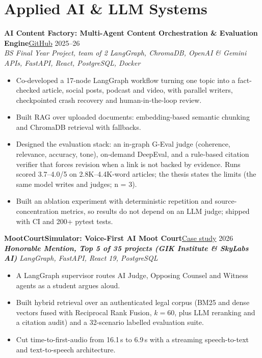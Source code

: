 \documentclass[10pt,a4paper]{article}
\newcommand{\project}[3]{%
  \par\addvspace{5pt}\needspace{6\baselineskip}\textbf{#1}\hfill{\small #2}\\[-1pt]
  {\small\itshape\color{muted} #3}\par}
\begin{document}
\section{Applied AI \& LLM Systems}

\project{AI Content Factory: Multi-Agent Content Orchestration \& Evaluation Engine}
  {\href{https://github.com/Shah-123/Ai-Content-Facotry}{GitHub} \textbar{} 2025--26}
  {BS Final Year Project, team of 2 \textbullet{} LangGraph, ChromaDB, OpenAI \& Gemini APIs,
   FastAPI, React, PostgreSQL, Docker}
\begin{itemize}
  \item Co-developed a 17-node LangGraph workflow turning one topic into a fact-checked article,
        social posts, podcast and video, with parallel writers, checkpointed crash recovery and
        human-in-the-loop review.
  \item Built RAG over uploaded documents: embedding-based semantic chunking and ChromaDB retrieval
        with fallbacks.
  \item Designed the evaluation stack: an in-graph G-Eval judge (coherence, relevance, accuracy, tone),
        on-demand DeepEval, and a rule-based citation verifier that forces revision when a link is
        not backed by evidence. Runs scored 3.7--4.0/5 on 2.8K--4.4K-word articles; the thesis
        states the limits (the same model writes and judges; n = 3).
  \item Built an ablation experiment with deterministic repetition and source-concentration metrics,
        so results do not depend on an LLM judge; shipped with CI and 200+ pytest tests.
\end{itemize}

\project{MootCourtSimulator: Voice-First AI Moot Court}
  {\href{https://shah-123.github.io/my_portfolio.github.io/}{Case study} \textbar{} 2026}
  {\textbf{Honorable Mention, Top 5 of 35 projects (GIK Institute \& SkyLabs AI)} \textbullet{}
   LangGraph, FastAPI, React 19, PostgreSQL}
\begin{itemize}
  \item A LangGraph supervisor routes AI Judge, Opposing Counsel and Witness agents as a student
        argues aloud.
  \item Built hybrid retrieval over an authenticated legal corpus (BM25 and dense vectors fused with
        Reciprocal Rank Fusion, $k{=}60$, plus LLM reranking and a citation audit) and a
        32-scenario labelled evaluation suite.
  \item Cut time-to-first-audio from 16.1\,s to 6.9\,s with a streaming speech-to-text and
        text-to-speech architecture.
\end{itemize}
\end{document}
